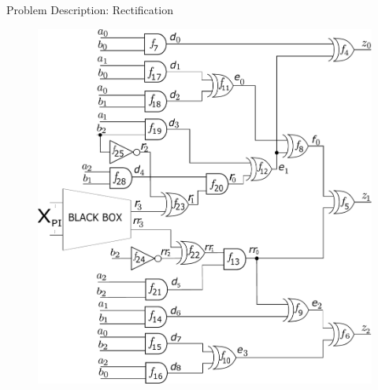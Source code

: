 \begin{frame}{\large Problem Description: Rectification}

\begin{figure}[hbt]
\centering
\includegraphics[scale=0.26]{mas_3_ddc_mfr_b_bb.pdf}
\caption*{
}\label{fig:mas_bug_Wb_bb}
\end{figure}
\end{frame}


